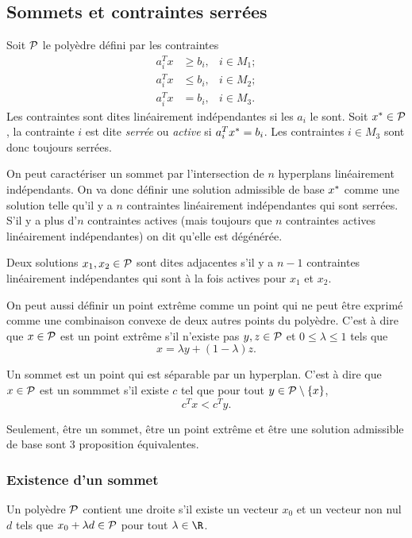 \subsection{Sommets et contraintes serrées}
Soit $\mathcal{P}$ le polyèdre défini par les contraintes
\begin{align*}
  a_i^T x & \geq b_i, & i \in M_1;\\
  a_i^T x & \leq b_i, & i \in M_2;\\
  a_i^T x & = b_i, & i \in M_3.
\end{align*}
Les contraintes sont dites linéairement indépendantes si les $a_i$ le sont.
Soit $x^* \in \mathcal{P}$,
la contrainte $i$ est dite \emph{serrée} ou \emph{active} si $a_i^Tx^* = b_i$.
Les contraintes $i \in M_3$ sont donc toujours serrées.

On peut caractériser un sommet par l'intersection de $n$ hyperplans
linéairement indépendants.
On va donc définir une solution admissible de base $x^*$ comme une solution
telle qu'il y a $n$ contraintes linéairement indépendantes qui sont serrées.
S'il y a plus d'$n$ contraintes actives (mais toujours que $n$ contraintes
actives linéairement indépendantes) on dit qu'elle est dégénérée.

Deux solutions $x_1, x_2 \in \mathcal{P}$ sont dites
adjacentes s'il y a $n-1$ contraintes linéairement indépendantes qui sont
à la fois actives pour $x_1$ et $x_2$.

On peut aussi définir un point extrême comme
un point qui ne peut être exprimé comme une combinaison convexe de deux
autres points du polyèdre.
C'est à dire que $x\in \mathcal{P}$ est un point extrême s'il
n'existe pas $y,z \in \mathcal{P}$ et
$0 \leq \lambda \leq 1$ tels que
\[ x = \lambda y + (1-\lambda)z. \]

Un sommet est un point qui est séparable par un hyperplan.
C'est à dire que $x \in \mathcal{P}$ est un sommmet s'il existe $c$
tel que pour tout $y \in \mathcal{P}\setminus\{x\}$,
\[ c^Tx < c^Ty. \]

Seulement, être un sommet, être un point extrême et être une solution
admissible de base sont 3 proposition équivalentes.

\subsubsection{Existence d'un sommet}
\begin{mydef}
  Un polyèdre $\mathcal{P}$ contient une droite s'il existe un vecteur $x_0$
  et un vecteur non nul $d$ tels que $x_0 + \lambda d \in \mathcal{P}$
  pour tout $\lambda \in \R$.
\end{mydef}

